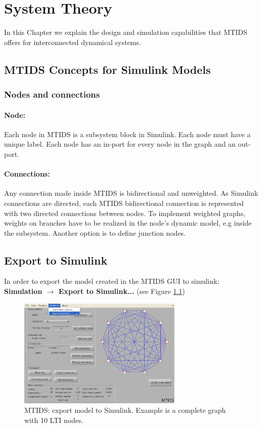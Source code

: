 \documentclass[a4paper,twoside, openright,12pt]{report}
\begin{document}


\chapter{System Theory}\label{chapter3}

In this Chapter we explain the design and simulation capabilities that MTIDS offers for interconnected dynamical systems.

\section{MTIDS Concepts for Simulink Models} \label{subsystemConcept}
\subsection{Nodes and connections}
\subsubsection{Node:}
Each node in MTIDS is a subsystem block in Simulink. Each node must have a unique label.
Each node has an in-port for every node in the graph and an out-port. 
\subsubsection{Connections:}
Any connection made inside MTIDS is bidirectional and unweighted. As Simulink connections are directed, each MTIDS bidirectional connection
 is represented with two directed connections between nodes. To implement weighted graphs, weights 
on branches have to be realized in the node's dynamic model, e.g inside the subsystem. Another option is to define junction nodes.

\section{Export to Simulink}\label{exportToSimulink}
In order to export the model created in the MTIDS GUI to simulink: \textbf{Simulation $\rightarrow$ Export to Simulink...} (see Figure \ref{exportFig})
\\
\begin{figure}[htb]
\centering
\includegraphics[width=0.7\textwidth]{pics/screenExport.eps}
\caption[MTIDS export to Simulink]{MTIDS: export model to Simulink. Example is a complete graph with 10 LTI nodes. }
\label{exportFig}
\end{figure}
\end{document}
